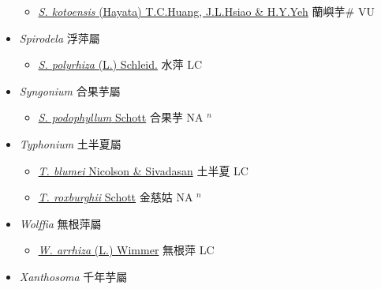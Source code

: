 \begin{itemize}
  \begin{itemize}
        \item[] \href{http://www.theplantlist.org/tpl1.1/search?q=Schismatoglottis+kotoensis}{\textit{S. kotoensis} (Hayata) T.C.Huang, J.L.Hsiao \& H.Y.Yeh}   蘭嶼芋\# VU
  \end{itemize}
 \item[] \textit{Spirodela} 浮萍屬
                    
  \begin{itemize}
        \item[] \href{http://www.theplantlist.org/tpl1.1/search?q=Spirodela+polyrhiza}{\textit{S. polyrhiza} (L.) Schleid.}   水萍 LC
  \end{itemize}
 \item[] \textit{Syngonium} 合果芋屬
                    
  \begin{itemize}
        \item[] \href{http://www.theplantlist.org/tpl1.1/search?q=Syngonium+podophyllum}{\textit{S. podophyllum} Schott}   合果芋 NA $^n$
  \end{itemize}
 \item[] \textit{Typhonium} 土半夏屬
                    
  \begin{itemize}
        \item[] \href{http://www.theplantlist.org/tpl1.1/search?q=Typhonium+blumei}{\textit{T. blumei} Nicolson \& Sivadasan}   土半夏 LC
        \item[] \href{http://www.theplantlist.org/tpl1.1/search?q=Typhonium+roxburghii}{\textit{T. roxburghii} Schott}   金慈姑 NA $^n$
  \end{itemize}
 \item[] \textit{Wolffia} 無根萍屬
                    
  \begin{itemize}
        \item[] \href{http://www.theplantlist.org/tpl1.1/search?q=Wolffia+arrhiza}{\textit{W. arrhiza} (L.) Wimmer}   無根萍 LC
  \end{itemize}
 \item[] \textit{Xanthosoma} 千年芋屬
                    

\end{itemize}
